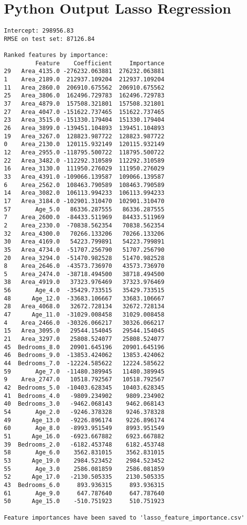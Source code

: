 \documentclass[12pt, a4paper]{report}
\begin{document}
\section*{Python Output Lasso Regression}
\begin{lstlisting}[style=pythonstyle]
Intercept: 298956.83
RMSE on test set: 87126.84

Ranked features by importance:
         Feature    Coefficient     Importance
29   Area_4135.0 -276232.063881  276232.063881
1    Area_2189.0  212937.109204  212937.109204
11   Area_2860.0  206910.675562  206910.675562
25   Area_3806.0  162496.729783  162496.729783
37   Area_4879.0  157508.321801  157508.321801
27   Area_4047.0 -151622.737465  151622.737465
23   Area_3515.0 -151330.179404  151330.179404
26   Area_3899.0 -139451.104893  139451.104893
19   Area_3267.0  128823.987722  128823.987722
0    Area_2130.0  120115.932149  120115.932149
12   Area_2955.0 -118795.500722  118795.500722
22   Area_3482.0 -112292.310589  112292.310589
16   Area_3130.0  111950.276029  111950.276029
33   Area_4391.0 -109066.139587  109066.139587
6    Area_2562.0  108463.790589  108463.790589
14   Area_3082.0  106113.994233  106113.994233
17   Area_3184.0 -102901.310470  102901.310470
57       Age_5.0   86336.287555   86336.287555
7    Area_2600.0  -84433.511969   84433.511969
2    Area_2330.0  -70838.562354   70838.562354
32   Area_4300.0   70266.133206   70266.133206
30   Area_4169.0   54223.799891   54223.799891
35   Area_4734.0  -51707.256790   51707.256790
20   Area_3294.0  -51470.982528   51470.982528
8    Area_2646.0  -43573.736970   43573.736970
5    Area_2474.0  -38718.494500   38718.494500
38   Area_4919.0   37323.976469   37323.976469
56       Age_4.0  -35429.733515   35429.733515
48      Age_12.0  -33683.106667   33683.106667
28   Area_4068.0   32672.728134   32672.728134
47      Age_11.0  -31029.008458   31029.008458
4    Area_2466.0  -30326.066217   30326.066217
15   Area_3095.0   29544.154045   29544.154045
21   Area_3297.0   25808.524077   25808.524077
45  Bedrooms_8.0   20901.645196   20901.645196
46  Bedrooms_9.0  -13853.424062   13853.424062
44  Bedrooms_7.0  -12224.585622   12224.585622
59       Age_7.0  -11480.389945   11480.389945
9    Area_2747.0   10518.792567   10518.792567
42  Bedrooms_5.0  -10403.628345   10403.628345
41  Bedrooms_4.0   -9809.234902    9809.234902
40  Bedrooms_3.0   -9462.068143    9462.068143
54       Age_2.0   -9246.378328    9246.378328
49      Age_13.0   -9226.896174    9226.896174
60       Age_8.0   -8993.951549    8993.951549
51      Age_16.0   -6923.667882    6923.667882
39  Bedrooms_2.0   -6182.453748    6182.453748
58       Age_6.0    3562.831015    3562.831015
53      Age_19.0    2984.523452    2984.523452
55       Age_3.0    2586.081859    2586.081859
52      Age_17.0   -2130.505335    2130.505335
43  Bedrooms_6.0     893.936315     893.936315
61       Age_9.0     647.787640     647.787640
50      Age_15.0    -510.751923     510.751923

Feature importances have been saved to 'lasso_feature_importance.csv'
\end{lstlisting}
\end{document}
